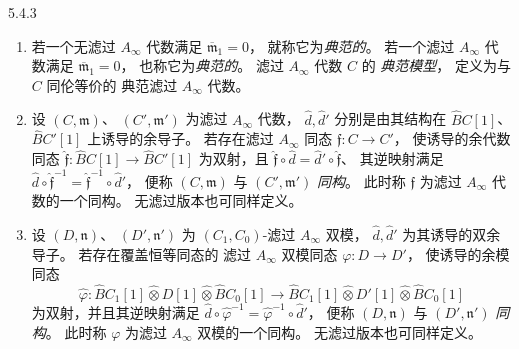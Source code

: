 \newpage
{}
\begin{definition}{5.4.3}\label{def:5-4-3}
\begin{enumerate}
\item
若一个无滤过 $A_\infty$ 代数满足
$\overline{\mathfrak m}_1=0$，
就称它为\emph{典范的}。
若一个滤过 $A_\infty$ 代数满足
$\overline{\mathfrak m}_1=0$，
也称它为\emph{典范的}。
滤过 $A_\infty$ 代数 $C$ 的
\emph{典范模型}，
定义为与 $C$ 同伦等价的
典范滤过 $A_\infty$ 代数。

\item{}
设 $(C,\mathfrak m)$、
$(C',\mathfrak m')$
为滤过 $A_\infty$ 代数，
$\widehat d,\widehat d'$
分别是由其结构在
$\widehat BC[1]$、
$\widehat BC'[1]$
上诱导的余导子。
若存在滤过 $A_\infty$ 同态
$\mathfrak f\colon C\to C'$，
使诱导的余代数同态
$\widehat{\mathfrak f}\colon
\widehat BC[1]\to\widehat BC'[1]$
为双射，且
$\widehat{\mathfrak f}\circ\widehat d
=\widehat d'\circ\widehat{\mathfrak f}$、
其逆映射满足
$\widehat d\circ\widehat{\mathfrak f}^{-1}
=\widehat{\mathfrak f}^{-1}\circ\widehat d'$，
便称 $(C,\mathfrak m)$
与 $(C',\mathfrak m')$
\emph{同构}。
此时称 $\mathfrak f$
为滤过 $A_\infty$ 代数的一个同构。
无滤过版本也可同样定义。

\item{}
设 $(D,\mathfrak n)$、
$(D',\mathfrak n')$
为 $(C_1,C_0)$-滤过
$A_\infty$ 双模，
$\widehat d,\widehat d'$
为其诱导的双余导子。
若存在覆盖恒等同态的
滤过 $A_\infty$ 双模同态
$\varphi\colon D\to D'$，
使诱导的余模同态
\[
\widehat\varphi\colon
\widehat BC_1[1]\widehat\otimes
D[1]\widehat\otimes
\widehat BC_0[1]
\longrightarrow
\widehat BC_1[1]\widehat\otimes
D'[1]\widehat\otimes
\widehat BC_0[1]
\]
为双射，并且其逆映射满足
$\widehat d\circ\widehat\varphi^{-1}
=\widehat\varphi^{-1}\circ\widehat d'$，
便称 $(D,\mathfrak n)$
与 $(D',\mathfrak n')$
\emph{同构}。
此时称 $\varphi$
为滤过 $A_\infty$ 双模的一个同构。
无滤过版本也可同样定义。
\end{enumerate}
\end{definition}

